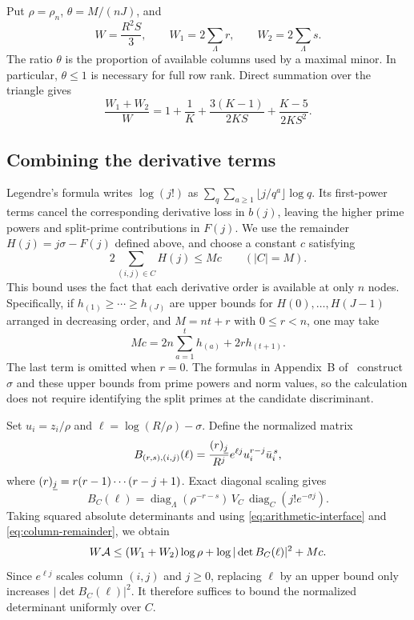 Put $\rho=\rho_n$, $\theta=M/(nJ)$, and
\begin{equation}\label{eq:normalization}
 W=\frac{R^2S}{3},\qquad W_1=2\sum_\Lambda r,\qquad W_2=2\sum_\Lambda s.
\end{equation}
The ratio $\theta$ is the proportion of available columns used by a maximal
minor. In particular, $\theta\leq1$ is necessary for full row rank. Direct
summation over the triangle gives
\begin{equation}\label{eq:radius-coefficient}
 \frac{W_1+W_2}{W}
 =1+\frac1K+\frac{3(K-1)}{2KS}+\frac{K-5}{2KS^2}.
\end{equation}



\subsection{Combining the derivative terms}
Legendre's formula writes $\log(j!)$ as
$\sum_q\sum_{a\geq1}\lfloor j/q^a\rfloor\log q$. Its first-power
terms cancel the corresponding derivative loss in $b(j)$, leaving the
higher prime powers and split-prime contributions in $F(j)$. We use the
remainder $H(j)=j\sigma-F(j)$ defined above,
and choose a constant $c$ satisfying
\begin{equation}\label{eq:column-remainder}
 2\sum_{(i,j)\in C}H(j)\leq Mc\qquad(|C|=M).
\end{equation}
This bound uses the fact that each derivative order is available at only
$n$ nodes. Specifically, if $h_{(1)}\geq\cdots\geq h_{(J)}$ are upper
bounds for $H(0),\ldots,H(J-1)$ arranged in decreasing order, and
$M=nt+r$ with $0\leq r<n$, one may take
\[
 Mc=2n\sum_{a=1}^{t}h_{(a)}+2r h_{(t+1)}.
\]
The last term is omitted when $r=0$. The formulas in Appendix~B of~\cite{chung498} construct $\sigma$ and these upper bounds from prime powers and norm
values, so the calculation does not require identifying the split primes
at the candidate discriminant.

Set $u_i=z_i/\rho$ and $\ell=\log(R/\rho)-\sigma$. Define the normalized
matrix
\begin{equation}\label{eq:residual-matrix}
 B_{(r,s),(i,j)}(\ell)
 =\frac{(r)_{\underline{j}}}{R^j}e^{\ell j}u_i^{r-j}\bar u_i^{\,s},
\end{equation}
where $(r)_{\underline{j}}=r(r-1)\cdots(r-j+1)$. Exact diagonal scaling gives
\[
 B_C(\ell)=\operatorname{diag}_{\Lambda}(\rho^{-r-s})\,
 V_C\,\operatorname{diag}_C(j!e^{-\sigma j}).
\]
Taking squared absolute determinants and using \eqref{eq:arithmetic-interface} and
\eqref{eq:column-remainder}, we obtain
\begin{equation}\label{eq:comparison-before-size}
 W\mathcal A\leq (W_1+W_2)\log\rho+
                \log|\det B_C(\ell)|^2+Mc.
\end{equation}
Since $e^{\ell j}$ scales column $(i,j)$ and $j\geq0$, replacing
$\ell$ by an upper bound only increases $|\det B_C(\ell)|^2$. It
therefore suffices to bound the normalized determinant uniformly over $C$.

